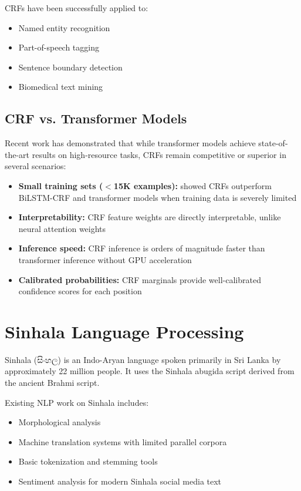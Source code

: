 \documentclass[12pt, a4paper, twoside]{report}
\begin{document}
CRFs have been successfully applied to:
\begin{itemize}
    \item Named entity recognition \citep{lample2016neural}
    \item Part-of-speech tagging \citep{toutanova2003feature}
    \item Sentence boundary detection \citep{read2012sentence}
    \item Biomedical text mining \citep{song2018comparison}
\end{itemize}

\subsection{CRF vs. Transformer Models}

Recent work has demonstrated that while transformer models achieve state-of-the-art results on high-resource tasks, CRFs remain competitive or superior in several scenarios:

\begin{itemize}
    \item \textbf{Small training sets ($<$15K examples):} \citet{yang2018design} showed CRFs outperform BiLSTM-CRF and transformer models when training data is severely limited
    \item \textbf{Interpretability:} CRF feature weights are directly interpretable, unlike neural attention weights
    \item \textbf{Inference speed:} CRF inference is orders of magnitude faster than transformer inference without GPU acceleration
    \item \textbf{Calibrated probabilities:} CRF marginals provide well-calibrated confidence scores for each position
\end{itemize}

\section{Sinhala Language Processing}
\label{sec:sinhala-nlp}

Sinhala (සිංහල) is an Indo-Aryan language spoken primarily in Sri Lanka by approximately 22 million people. It uses the Sinhala abugida script derived from the ancient Brahmi script.

Existing NLP work on Sinhala includes:
\begin{itemize}
    \item Morphological analysis \citep{hettige2006sinhala}
    \item Machine translation systems with limited parallel corpora
    \item Basic tokenization and stemming tools
    \item Sentiment analysis for modern Sinhala social media text
\end{itemize}
\end{document}
